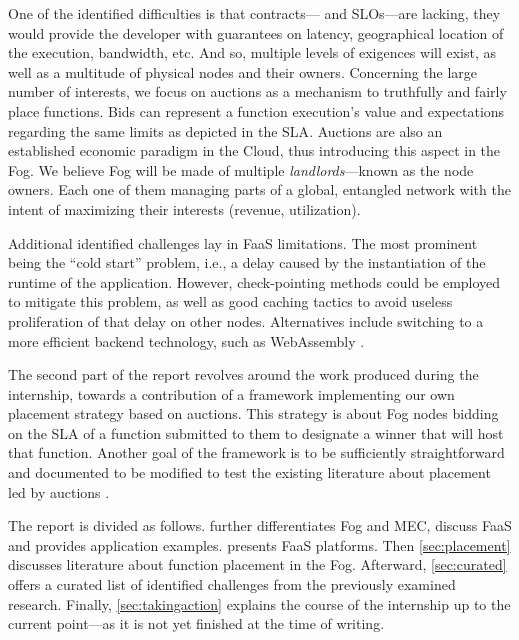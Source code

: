 One of the identified difficulties is that contracts— and \glspl{SLO}—are lacking, they would provide the developer with guarantees on latency, geographical location of the execution, bandwidth, etc. And so, multiple levels of exigences will exist, as well as a multitude of physical nodes and their owners. Concerning the large number of interests, we focus on auctions as a mechanism to truthfully and fairly place functions. Bids can represent a function execution’s value and expectations regarding the same limits as depicted in the \gls{SLA}. Auctions are also an established economic paradigm in the Cloud, thus introducing this aspect in the Fog. We believe Fog will be made of multiple \emph{landlords}—known as the node owners. Each one of them managing parts of a global, entangled network with the intent of maximizing their interests (revenue, utilization).

Additional identified challenges lay in \gls{FaaS} limitations. The most prominent being the “cold start” problem, i.e., a delay caused by the instantiation of the runtime of the application. However, check-pointing methods could be employed to mitigate this problem, as well as good caching tactics to avoid useless proliferation of that delay on other nodes. Alternatives include switching to a more efficient backend technology, such as WebAssembly \cite{hykes_solomon_2019}.

The second part of the report revolves around the work produced during the internship, towards a contribution of a framework implementing our own placement strategy based on auctions. This strategy is about Fog nodes bidding on the \gls{SLA} of a function submitted to them to designate a winner that will host that function. Another goal of the framework is to be sufficiently straightforward and documented to be modified to test the existing literature about placement led by auctions \cite{bermbach_auctionwhisk_2021,tasiopoulos_fogspot_2019}.

The report is divided as follows.  further differentiates Fog and \gls{MEC}, discuss \gls{FaaS} and provides application examples.  presents \gls{FaaS} platforms. Then \cref{sec:placement} discusses literature about function placement in the Fog. Afterward, \cref{sec:curated} offers a curated list of identified challenges from the previously examined research. Finally, \cref{sec:takingaction} explains the course of the internship up to the current point—as it is not yet finished at the time of writing.

